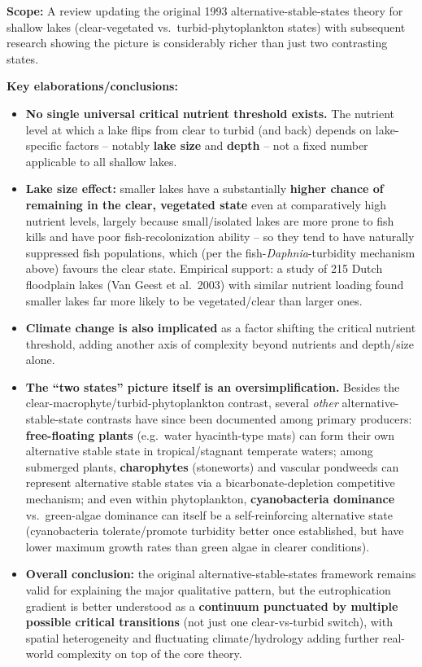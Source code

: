 \documentclass[11pt,a4paper]{article}
\begin{document}
\begin{papbox}[title={Paper Summary: Scheffer \& van Nes (2007), \textit{Hydrobiologia} 584:455--466 -- ``Shallow Lakes Theory Revisited: Various Alternative Regimes Driven by Climate, Nutrients, Depth and Lake Size''}]
\textbf{Scope:} A review updating the original 1993 alternative-stable-states theory for shallow lakes (clear-vegetated vs.\ turbid-phytoplankton states) with subsequent research showing the picture is considerably richer than just two contrasting states.

\textbf{Key elaborations/conclusions:}
\begin{itemize}[leftmargin=1.3em,nosep]
\item \textbf{No single universal critical nutrient threshold exists.} The nutrient level at which a lake flips from clear to turbid (and back) depends on lake-specific factors -- notably \textbf{lake size} and \textbf{depth} -- not a fixed number applicable to all shallow lakes.
\item \textbf{Lake size effect:} smaller lakes have a substantially \textbf{higher chance of remaining in the clear, vegetated state} even at comparatively high nutrient levels, largely because small/isolated lakes are more prone to fish kills and have poor fish-recolonization ability -- so they tend to have naturally suppressed fish populations, which (per the fish-\textit{Daphnia}-turbidity mechanism above) favours the clear state. Empirical support: a study of 215 Dutch floodplain lakes (Van Geest et al.\ 2003) with similar nutrient loading found smaller lakes far more likely to be vegetated/clear than larger ones.
\item \textbf{Climate change is also implicated} as a factor shifting the critical nutrient threshold, adding another axis of complexity beyond nutrients and depth/size alone.
\item \textbf{The ``two states'' picture itself is an oversimplification.} Besides the clear-macrophyte/turbid-phytoplankton contrast, several \emph{other} alternative-stable-state contrasts have since been documented among primary producers: \textbf{free-floating plants} (e.g.\ water hyacinth-type mats) can form their own alternative stable state in tropical/stagnant temperate waters; among submerged plants, \textbf{charophytes} (stoneworts) and vascular pondweeds can represent alternative stable states via a bicarbonate-depletion competitive mechanism; and even within phytoplankton, \textbf{cyanobacteria dominance} vs.\ green-algae dominance can itself be a self-reinforcing alternative state (cyanobacteria tolerate/promote turbidity better once established, but have lower maximum growth rates than green algae in clearer conditions).
\item \textbf{Overall conclusion:} the original alternative-stable-states framework remains valid for explaining the major qualitative pattern, but the eutrophication gradient is better understood as a \textbf{continuum punctuated by multiple possible critical transitions} (not just one clear-vs-turbid switch), with spatial heterogeneity and fluctuating climate/hydrology adding further real-world complexity on top of the core theory.
\end{itemize}
\end{papbox}
\end{document}
